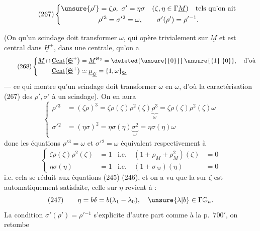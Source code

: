 
\[
\tag{267}
\left\{
\begin{gathered}
\unsure{\rho'}=\zeta\rho,\ \sigma'=\eta\sigma
\quad(\zeta,\eta\in\Gamma\underline M)\quad\text{tels qu'on ait}
\\
\rho'{}^3=\sigma'{}^2=\omega,\qquad
\sigma'(\rho')=\rho'{}^{-1}.
\end{gathered}\right.
\]

(On  qu'un scindage doit transformer $\omega$,
qui opère trivialement sur $\underline M$ et est central
dans $\underline H^+$, dans une 
 centrale, 
   qu'on a
\[
\tag{268}
\left\{\begin{aligned}
\underline M\cap\underline{\mathrm{Cent}}\bigl(\underline{\mathfrak S}^+\bigr)
&=\underline M^{\mathfrak S_3}
=\deleted{\unsure{\{0\}}}\,\unsure{\{1\}|\{0\}},\quad\text{d'où}
\\
\underline{\mathrm{Cent}}\bigl(\underline{\mathfrak S}^+\bigr)
&\simeq\underline\mu_{\underline{\mathfrak S}}
=\{1,\omega\}_{\underline{\mathfrak S}}
\end{aligned}\right.
\]
--- ce qui montre qu'un scindage doit transformer $\omega$ en $\omega$,
d'où  la caractérisation (267) des $\rho',\sigma'$
 à un scindage).
On en aura
\[
\left\{\begin{aligned}
\rho'{}^3&=(\zeta\rho)^3
=\zeta\rho(\zeta)\rho^2(\zeta)\underbrace{\rho^3}_{\omega}
=\zeta\rho(\zeta)\rho^2(\zeta)\omega
\\
\sigma'{}^2&=(\eta\sigma)^2
=\eta\sigma(\eta)\underbrace{\sigma^2}_{\omega}
=\eta\sigma(\eta)\omega
\end{aligned}\right.
\]
donc les  équations $\rho'{}^3=\omega$ et
$\sigma'{}^2=\omega$ équivalent respectivement à
\[
\left\{\begin{aligned}
\zeta\rho(\zeta)\rho^2(\zeta)&=1
&\text{i.e.}\quad(1+\rho_M+\rho_M^2)(\zeta)&=0
\\
\eta\sigma(\eta)&=1
&\text{i.e.}\quad(1+\sigma_M)(\eta)&=0
\end{aligned}\right.
\]
i.e. cela se réduit aux équations (245) (246),
et on a vu que la 
sur $\zeta$ est automatiquement satisfaite, celle
sur $\eta$ revient à :
\[
(247)\qquad
\eta=b\delta=b(\lambda_1-\lambda_0),\quad
\unsure{\lambda|b}\in\Gamma\mathbb G_a.
\]
La condition $\sigma'(\rho')=\rho'{}^{-1}$ s'explicite d'autre
part comme à la p.~$700'$, on retombe

